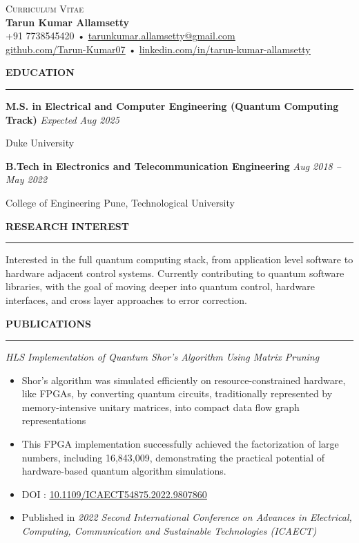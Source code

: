 \documentclass[a4paper,10pt]{article}
\let\oldhref\href
\renewcommand{\href}[2]{\oldhref{#1}{\uline{#2}}}
\newcommand{\cvHeaderOne}[1]{%
  \vspace*{1.5em}%
  {\noindent\large\textbf{\MakeUppercase{#1}}\par}%
  \noindent\rule{\linewidth}{0.4pt}%
  \vspace*{0.5em}%
}
\newcommand{\cvHeaderTwo}[2]{%
  \vspace{0.8em}%
  \noindent\textbf{\normalsize #1} \hfill \textit{#2}\par%
}
\newcommand{\cvHeaderThree}[1]{%
  \noindent\textit{#1}%
}
\newcommand{\cvItem}[1]{%
  \noindent\parbox{\dimexpr\linewidth}{#1}\par%
}
\newenvironment{cvItemList}{%
  \begin{itemize}%
    \setlength{\itemsep}{0.1em}%
    \setlength{\topsep}{0em}%
    \setlength{\partopsep}{0em}%
    \setlength{\parsep}{0em}%
    \setlength{\parskip}{0em}%
}{%
  \end{itemize}%
}
\begin{document}
\begin{center}
  {\large \textsc{Curriculum Vitae}} \\[0.3em]
  {\LARGE \textbf{Tarun Kumar Allamsetty}} \\[0.75em]
  \small
  +91 7738545420 \quad • \quad \href{mailto:tarunkumar.allamsetty@gmail.com}{tarunkumar.allamsetty@gmail.com} \\[0.2em]
  \href{https://github.com/Tarun-Kumar07}{github.com/Tarun-Kumar07} \quad • \quad
  \href{https://www.linkedin.com/in/tarun-kumar-allamsetty}{linkedin.com/in/tarun-kumar-allamsetty}
\end{center}

\vspace{2em}

\cvHeaderOne{Education}

\cvHeaderTwo{M.S. in Electrical and Computer Engineering (Quantum Computing Track)}{Expected Aug 2025}
\cvItem{Duke University}

\cvHeaderTwo{B.Tech in Electronics and Telecommunication Engineering}{Aug 2018 -- May 2022}
\cvItem{College of Engineering Pune, Technological University}


\cvHeaderOne{Research interest}
Interested in the full quantum computing stack, from application level software to hardware adjacent control systems. Currently contributing to quantum software libraries, with the goal of moving deeper into quantum control, hardware interfaces, and cross layer approaches to error correction.

\cvHeaderOne{Publications}

\cvHeaderThree{HLS Implementation of Quantum Shor’s Algorithm Using Matrix Pruning}
\begin{cvItemList}
\item Shor's algorithm was simulated efficiently on resource-constrained hardware, like FPGAs, by converting quantum circuits, traditionally represented by memory-intensive unitary matrices, into compact data flow graph representations
\item This FPGA implementation successfully achieved the factorization of large numbers, including 16,843,009, demonstrating the practical potential of hardware-based quantum algorithm simulations.
\item DOI : \href{https://doi.org/10.1109/ICAECT54875.2022.9807860}{10.1109/ICAECT54875.2022.9807860}
\item Published in \textit{2022 Second International Conference on Advances in Electrical, Computing, Communication and Sustainable Technologies (ICAECT)}
\end{cvItemList}
\end{document}

